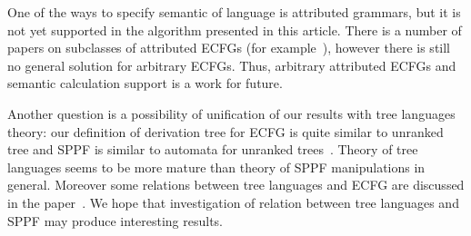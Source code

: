 \documentclass[runningheads,a4paper]{llncs}
\begin{document}
One of the ways to specify semantic of language is attributed grammars, but it is not yet supported in the algorithm presented in this article.
There is a number of papers on subclasses of attributed ECFGs (for example~\cite{AttributedELL}), however there is still no general solution for arbitrary ECFGs.
Thus, arbitrary attributed ECFGs and semantic calculation support is a work for future.

Another question is a possibility of unification of our results with tree languages theory: our definition of derivation tree for ECFG is quite similar to unranked tree and SPPF is similar to automata for unranked trees~\cite{TATA}.
Theory of tree languages seems to be more mature than theory of SPPF manipulations in general.
Moreover some relations between tree languages and ECFG are discussed in the paper~\cite{TreeLangAndECFG}.
We hope that investigation of relation between tree languages and SPPF may produce interesting results.





\end{document}

